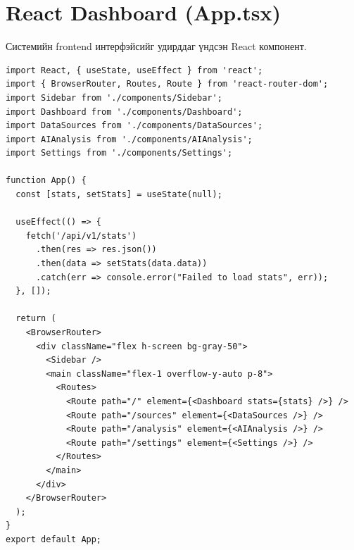 \section{React Dashboard (App.tsx)}
Системийн frontend интерфэйсийг удирддаг үндсэн React компонент.
\begin{verbatim}
import React, { useState, useEffect } from 'react';
import { BrowserRouter, Routes, Route } from 'react-router-dom';
import Sidebar from './components/Sidebar';
import Dashboard from './components/Dashboard';
import DataSources from './components/DataSources';
import AIAnalysis from './components/AIAnalysis';
import Settings from './components/Settings';

function App() {
  const [stats, setStats] = useState(null);

  useEffect(() => {
    fetch('/api/v1/stats')
      .then(res => res.json())
      .then(data => setStats(data.data))
      .catch(err => console.error("Failed to load stats", err));
  }, []);

  return (
    <BrowserRouter>
      <div className="flex h-screen bg-gray-50">
        <Sidebar />
        <main className="flex-1 overflow-y-auto p-8">
          <Routes>
            <Route path="/" element={<Dashboard stats={stats} />} />
            <Route path="/sources" element={<DataSources />} />
            <Route path="/analysis" element={<AIAnalysis />} />
            <Route path="/settings" element={<Settings />} />
          </Routes>
        </main>
      </div>
    </BrowserRouter>
  );
}
export default App;
\end{verbatim}

